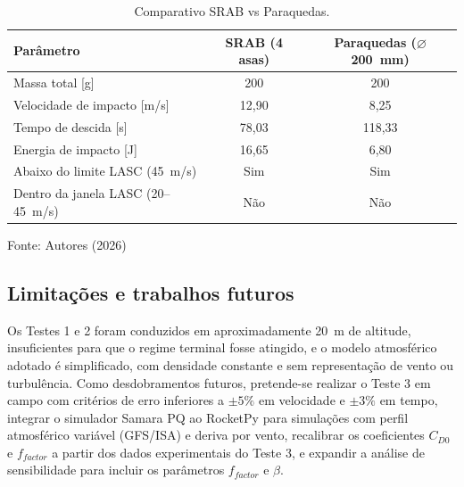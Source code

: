\begin{table}[htbp]
\caption{Comparativo SRAB vs Paraquedas.}
\centering
\begin{tabular*}{\textwidth}{@{\extracolsep{\fill}}lcc}
\hline
Parâmetro & SRAB (4 asas) & Paraquedas ($\varnothing$200~mm) \\
\hline
Massa total [g] & 200 & 200 \\
Velocidade de impacto [m/s] & 12,90 & 8,25 \\
Tempo de descida [s] & 78,03 & 118,33 \\
Energia de impacto [J] & 16,65 & 6,80 \\
Abaixo do limite LASC (45~m/s) & Sim & Sim \\
Dentro da janela LASC (20--45~m/s) & Não & Não \\
\hline
\end{tabular*}
{\footnotesize\centering Fonte: Autores (2026)\par}
\label{tab:benchmark}
\end{table}

\subsection{Limitações e trabalhos futuros}

Os Testes 1 e 2 foram conduzidos em aproximadamente 20~m de altitude, insuficientes para que o regime terminal fosse atingido, e o modelo atmosférico adotado é simplificado, com densidade constante e sem representação de vento ou turbulência. Como desdobramentos futuros, pretende-se realizar o Teste 3 em campo com critérios de erro inferiores a $\pm5\%$ em velocidade e $\pm3\%$ em tempo, integrar o simulador Samara PQ ao RocketPy \citep{rocketpy2024} para simulações com perfil atmosférico variável (GFS/ISA) e deriva por vento, recalibrar os coeficientes $C_{D0}$ e $f_{factor}$ a partir dos dados experimentais do Teste 3, e expandir a análise de sensibilidade para incluir os parâmetros $f_{factor}$ e $\beta$.
